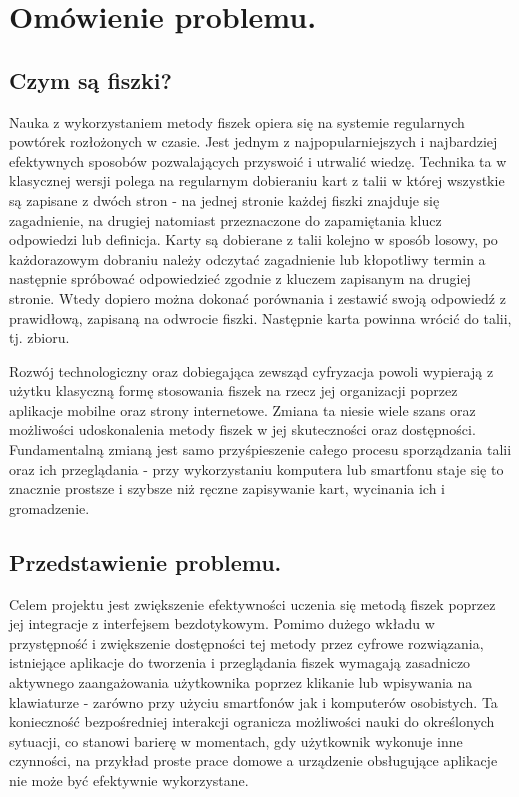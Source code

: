 \chapter{Omówienie problemu.}

\section{Czym są fiszki?}

Nauka z wykorzystaniem metody fiszek opiera się na systemie regularnych powtórek rozłożonych w czasie. Jest jednym z najpopularniejszych i najbardziej efektywnych sposobów pozwalających przyswoić i utrwalić wiedzę. Technika ta w klasycznej wersji polega na regularnym dobieraniu kart z talii w której wszystkie są zapisane z dwóch stron - na jednej stronie każdej fiszki znajduje się zagadnienie, na drugiej natomiast przeznaczone do zapamiętania klucz odpowiedzi lub definicja. Karty są dobierane z talii kolejno w sposób losowy, po każdorazowym dobraniu należy odczytać zagadnienie lub kłopotliwy termin a następnie spróbować odpowiedzieć zgodnie z kluczem zapisanym na drugiej stronie. Wtedy dopiero można dokonać porównania i zestawić swoją odpowiedź z prawidłową, zapisaną na odwrocie fiszki. Następnie karta powinna wrócić do talii, tj. zbioru.

Rozwój technologiczny oraz dobiegająca zewsząd cyfryzacja powoli wypierają z użytku klasyczną formę stosowania fiszek na rzecz jej organizacji poprzez aplikacje mobilne oraz strony internetowe. Zmiana ta niesie wiele szans oraz możliwości udoskonalenia metody fiszek w jej skuteczności oraz dostępności. Fundamentalną zmianą jest samo przyśpieszenie całego procesu sporządzania talii oraz ich przeglądania - przy wykorzystaniu komputera lub smartfonu staje się to znacznie prostsze i szybsze niż ręczne zapisywanie kart, wycinania ich i gromadzenie.

\section{Przedstawienie problemu.}

Celem projektu jest zwiększenie efektywności uczenia się metodą fiszek poprzez jej integracje z interfejsem bezdotykowym. Pomimo dużego wkładu w przystępność i zwiększenie dostępności tej metody przez cyfrowe rozwiązania, istniejące aplikacje do tworzenia i przeglądania fiszek wymagają zasadniczo aktywnego zaangażowania użytkownika poprzez klikanie lub wpisywania na klawiaturze - zarówno przy użyciu smartfonów jak i komputerów osobistych. Ta konieczność bezpośredniej interakcji ogranicza możliwości nauki do określonych sytuacji, co stanowi barierę w momentach, gdy użytkownik wykonuje inne czynności, na przykład proste prace domowe a urządzenie obsługujące aplikacje nie może być efektywnie wykorzystane.

